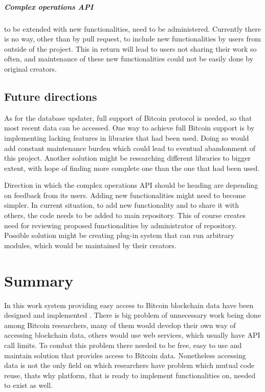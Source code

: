 \documentclass[12pt, en, eng, oneside]{mgr}
\begin{document}
\paragraph{Complex operations API} to be extended with new functionalities, need to be administered. Currently there is no way, other than by pull request, to include new functionalities by users from outside of the project. This in return will lead to users not sharing their work so often, and maintenance of these new functionalities could not be easily done by original creators.

\section{Future directions}
As for the database updater, full support of Bitcoin protocol is needed, so that most recent data can be accessed. One way to achieve full Bitcoin support is by implementing lacking features in libraries that had been used. Doing so would add constant maintenance burden which could lead to eventual abandonment of this project. Another solution might be researching different libraries to bigger extent, with hope of finding more complete one than the one that had been used.

Direction in which the complex operations API should be heading are depending on feedback from its users. Adding new functionalities might need to become simpler. In current situation, to add new functionality and to share it with others, the code needs to be added to main repository. This of course creates need for reviewing proposed functionalities by administrator of repository. Possible solution might be creating plug-in system that can run arbitrary modules, which would be maintained by their creators. 

\chapter{Summary}
In this work system providing easy access to Bitcoin blockchain data have been designed and implemented . There is big problem of unnecessary work being done among Bitcoin researchers, many of them would develop their own way of accessing blockchain data, others would use web services, which usually have API call limits. To combat this problem there needed to be free, easy to use and maintain solution that provides access to Bitcoin data. 
Nonetheless accessing data is not the only field on which researchers have problem which mutual code reuse, thats why platform, that is ready to implement functionalities on, needed to exist as well. 
\end{document}
